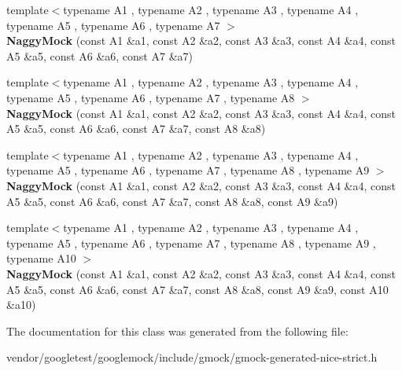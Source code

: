 \begin{DoxyCompactItemize}
\item 
\mbox{\label{classtesting_1_1_naggy_mock_ad1edac1991dd20514e822c90d6896c74}} 
{\footnotesize template$<$typename A1 , typename A2 , typename A3 , typename A4 , typename A5 , typename A6 , typename A7 $>$ }\\{\bfseries Naggy\+Mock} (const A1 \&a1, const A2 \&a2, const A3 \&a3, const A4 \&a4, const A5 \&a5, const A6 \&a6, const A7 \&a7)
\item 
\mbox{\label{classtesting_1_1_naggy_mock_a63b30506f56b792ffbdc5792a9630d5e}} 
{\footnotesize template$<$typename A1 , typename A2 , typename A3 , typename A4 , typename A5 , typename A6 , typename A7 , typename A8 $>$ }\\{\bfseries Naggy\+Mock} (const A1 \&a1, const A2 \&a2, const A3 \&a3, const A4 \&a4, const A5 \&a5, const A6 \&a6, const A7 \&a7, const A8 \&a8)
\item 
\mbox{\label{classtesting_1_1_naggy_mock_a786f31ade7b8b9f6e78e07f51cc0e14b}} 
{\footnotesize template$<$typename A1 , typename A2 , typename A3 , typename A4 , typename A5 , typename A6 , typename A7 , typename A8 , typename A9 $>$ }\\{\bfseries Naggy\+Mock} (const A1 \&a1, const A2 \&a2, const A3 \&a3, const A4 \&a4, const A5 \&a5, const A6 \&a6, const A7 \&a7, const A8 \&a8, const A9 \&a9)
\item 
\mbox{\label{classtesting_1_1_naggy_mock_aa40a39806b939f423696f9380de3172b}} 
{\footnotesize template$<$typename A1 , typename A2 , typename A3 , typename A4 , typename A5 , typename A6 , typename A7 , typename A8 , typename A9 , typename A10 $>$ }\\{\bfseries Naggy\+Mock} (const A1 \&a1, const A2 \&a2, const A3 \&a3, const A4 \&a4, const A5 \&a5, const A6 \&a6, const A7 \&a7, const A8 \&a8, const A9 \&a9, const A10 \&a10)
\end{DoxyCompactItemize}


The documentation for this class was generated from the following file\+:\begin{DoxyCompactItemize}
\item 
vendor/googletest/googlemock/include/gmock/gmock-\/generated-\/nice-\/strict.\+h\end{DoxyCompactItemize}
